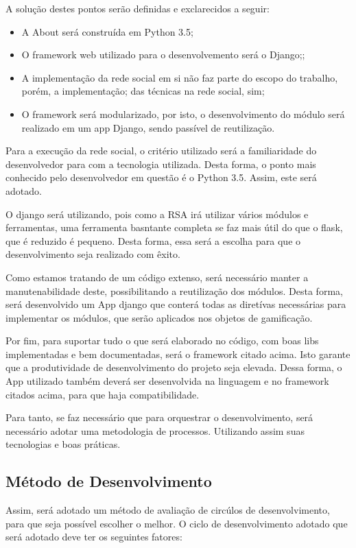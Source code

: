A solução destes pontos serão definidas e exclarecidos a seguir:

\begin{itemize}
    \item A About será construída em Python 3.5;
    \item  O framework web utilizado para o desenvolvemento será o Django;;
    \item A implementação da rede social em si não faz parte do escopo do trabalho, porém, a implementação;
        das técnicas na rede social, sim;
    \item O framework será modularizado, por isto, o desenvolvimento do módulo será realizado em um app
        Django, sendo passível de reutilização.
\end{itemize}

Para a execução da rede social, o critério utilizado será a familiaridade do desenvolvedor para com a tecnologia
utilizada. Desta forma, o  ponto mais conhecido pelo desenvolvedor em questão é o Python 3.5. Assim, este será adotado.

O django será utilizando, pois como a RSA irá utilizar vários módulos e ferramentas, uma ferramenta  basntante completa
se faz mais útil do que o flask, que é reduzido é pequeno. Desta forma, essa será a escolha para que o desenvolvimento seja
realizado com êxito.

Como estamos tratando de um código extenso, será necessário manter a manutenabilidade deste, possibilitando a reutilização dos
módulos. Desta forma, será desenvolvido um App django que conterá todas as diretívas necessárias para implementar os módulos, que serão aplicados
nos objetos de gamificação.

Por fim, para suportar tudo o que será elaborado no código, com boas libs implementadas e bem documentadas, será o framework citado
acima. Isto garante que a produtividade de desenvolvimento do projeto seja elevada. Dessa forma, o App utilizado também deverá ser
desenvolvida na linguagem e no framework citados acima, para que haja compatibilidade.

Para tanto, se faz necessário que para orquestrar o desenvolvimento, será necessário adotar uma metodologia de processos. Utilizando 
assim suas tecnologias e boas práticas.

\subsection{Método de Desenvolvimento}
\label{sub:m_todo_de_desenvolvimento}
Assim, será adotado um método de avaliação de circúlos de desenvolvimento, para que seja possível escolher o melhor.
O ciclo de desenvolvimento adotado que será adotado deve ter os seguintes fatores:

